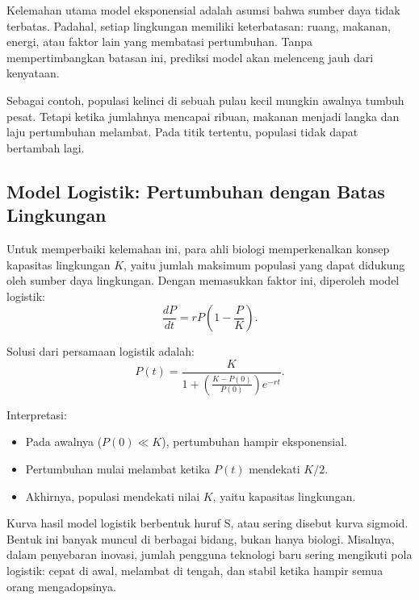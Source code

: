 \documentclass{bukumjh}
\begin{document}
Kelemahan utama model eksponensial adalah asumsi bahwa sumber daya tidak terbatas. Padahal, setiap lingkungan memiliki keterbatasan: ruang, makanan, energi, atau faktor lain yang membatasi pertumbuhan. Tanpa mempertimbangkan batasan ini, prediksi model akan melenceng jauh dari kenyataan.

Sebagai contoh, populasi kelinci di sebuah pulau kecil mungkin awalnya tumbuh pesat. Tetapi ketika jumlahnya mencapai ribuan, makanan menjadi langka dan laju pertumbuhan melambat. Pada titik tertentu, populasi tidak dapat bertambah lagi.

\subsection*{Model Logistik: Pertumbuhan dengan Batas Lingkungan}

Untuk memperbaiki kelemahan ini, para ahli biologi memperkenalkan konsep {\jsg kapasitas lingkungan} $K$, yaitu jumlah maksimum populasi yang dapat didukung oleh sumber daya lingkungan. Dengan memasukkan faktor ini, diperoleh model logistik:
\[
\frac{dP}{dt} = rP\left(1-\frac{P}{K}\right).
\]

Solusi dari persamaan logistik adalah:
\[
P(t) = \frac{K}{1 + \left(\frac{K - P(0)}{P(0)}\right) e^{-rt}}.
\]

{\jsg Interpretasi:}
\begin{itemize}
    \item Pada awalnya ($P(0) \ll K$), pertumbuhan hampir eksponensial.
    \item Pertumbuhan mulai melambat ketika $P(t)$ mendekati $K/2$.
    \item Akhirnya, populasi mendekati nilai $K$, yaitu kapasitas lingkungan.
\end{itemize}

Kurva hasil model logistik berbentuk huruf S, atau sering disebut {\jsg kurva sigmoid}. Bentuk ini banyak muncul di berbagai bidang, bukan hanya biologi. Misalnya, dalam penyebaran inovasi, jumlah pengguna teknologi baru sering mengikuti pola logistik: cepat di awal, melambat di tengah, dan stabil ketika hampir semua orang mengadopsinya.

\begin{center}
\end{center}
\end{document}
